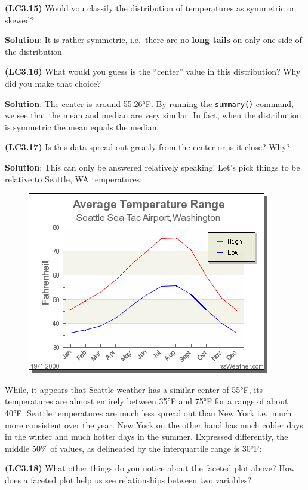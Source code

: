 \documentclass[12pt,]{krantz}
\begin{document}
\textbf{(LC3.15)} Would you classify the distribution of temperatures as
symmetric or skewed?

\textbf{Solution}: It is rather symmetric, i.e.~there are no
\textbf{long tails} on only one side of the distribution

\textbf{(LC3.16)} What would you guess is the ``center'' value in this
distribution? Why did you make that choice?

\textbf{Solution}: The center is around 55.26°F. By running the
\texttt{summary()} command, we see that the mean and median are very
similar. In fact, when the distribution is symmetric the mean equals the
median.

\textbf{(LC3.17)} Is this data spread out greatly from the center or is
it close? Why?

\textbf{Solution}: This can only be answered relatively speaking! Let's
pick things to be relative to Seattle, WA temperatures:

\begin{figure}
\centering
\includegraphics{images/temp.png}
\caption{}
\end{figure}

While, it appears that Seattle weather has a similar center of 55°F, its
temperatures are almost entirely between 35°F and 75°F for a range of
about 40°F. Seattle temperatures are much less spread out than New York
i.e.~much more consistent over the year. New York on the other hand has
much colder days in the winter and much hotter days in the summer.
Expressed differently, the middle 50\% of values, as delineated by the
interquartile range is 30°F:

\textbf{(LC3.18)} What other things do you notice about the faceted plot
above? How does a faceted plot help us see relationships between two
variables?
\end{document}
